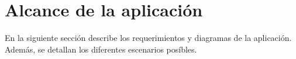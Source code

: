 \chapter{Alcance de la aplicación  } %
En la siguiente sección describe los requerimientos y diagramas de la aplicación. Además, se detallan los diferentes escenarios posíbles.
	